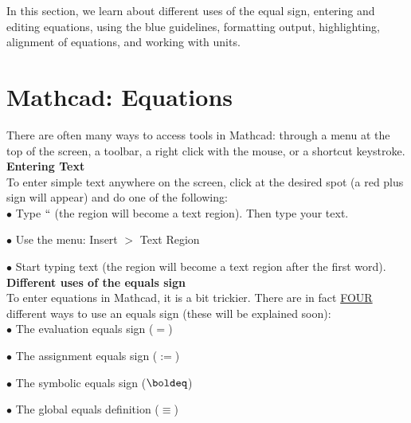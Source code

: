 
In this section, we learn about different uses of the equal sign, entering and editing equations, using the blue guidelines, formatting output, highlighting, alignment of equations, and working with units. 

\section{Mathcad: Equations}\label{sec:Mathcad_equations}

There are often many ways to access tools in Mathcad: through a menu at the top of the screen, a toolbar, a right click with the mouse, or a shortcut keystroke.\\

\noindent \large \textsf{\textbf{Entering Text}} \normalsize\\

To enter simple text anywhere on the screen, click at the desired spot (a red plus sign will appear) and do one of the following:\\

$\bullet$ Type $``$ (the region will become a text region).  Then type your text.

$\bullet$ Use the menu: Insert $>$ Text Region

$\bullet$ Start typing text (the region will become a text region after the first word).\\

\noindent \large \textsf{\textbf{Different uses of the equals sign}} \normalsize\\

To enter equations in Mathcad, it is a bit trickier.  There are in fact \underline{FOUR} different ways to use an equals sign (these will be explained soon):\\

$\bullet$ The evaluation equals sign ($=$)

$\bullet$ The assignment equals sign ($:=$) 

$\bullet$ The symbolic equals sign ($\boldeq$) 

$\bullet$ The global equals definition ($\equiv$)\\


